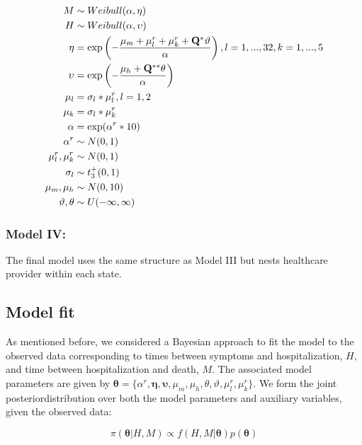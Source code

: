 \documentclass[10pt,letterpaper]{article}
\begin{document}
\[
\begin{aligned}
 M   &\sim Weibull(\alpha,\mathbf{\eta})\\
 H  &\sim Weibull(\alpha,\mathbf{\upsilon}) \\
 \mathbf{\eta} &= \exp \left(-\frac{\mu_m+\mathbf{\mu}_l^r+\mathbf{\mu}_k^r+\mathbf{Q}^*\mathbf{\vartheta}}{\alpha} \right),\space\space l=1,...,32,\space k=1,...,5\\
 \mathbf{\upsilon} &= \exp\left(-\frac{\mu_h+\mathbf{Q}^{**}\mathbf{\theta}}{\alpha}\right) \\
  \mathbf{\mu}_l&=\sigma_l*\mathbf{\mu}_l^r, \space\space l=1,2 \\
 \mathbf{\mu}_k&=\sigma_l*\mathbf{\mu}_k^r \\
 \alpha&=\exp(\alpha^r*10) \\
 \alpha^r&\sim N(0,1) \\
 \mu^r_l,\mu^r_k &\sim N(0,1) \\
 \sigma_l&\sim t^+_3(0,1) \\
 \mu_m,\mu_h &\sim N(0,10) \\
 \mathbf{\vartheta},\mathbf{\theta} &\sim U(-\infty,\infty) \\
\end{aligned}
\]

\hypertarget{model-iv}{%
\subsubsection{Model IV:}\label{model-iv}}

The final model uses the same structure as Model III but nests
healthcare provider within each state.

\hypertarget{model-fit}{%
\subsection{Model fit}\label{model-fit}}

As mentioned before, we considered a Bayesian approach to fit the model
to the observed data corresponding to times between symptoms and
hospitalization, \(H\), and time between hospitalization and death,
\(M\). The associated model parameters are given by
\(\bm{\theta}=\{\alpha^r,\mathbf{\eta},\mathbf{\upsilon},\mu_m,\mu_h,\theta,\vartheta,\mu^r_l,\mu^r_k\}\).
We form the joint posteriordistribution over both the model parameters
and auxiliary variables, given the observed data:

\[
\pi(\bm{\theta}|H,M)\propto f(H,M|\bm{\theta})p(\bm{\theta})
\]
\end{document}
